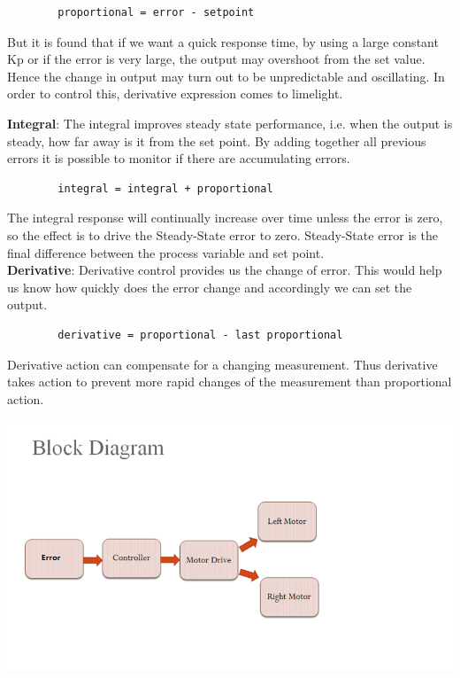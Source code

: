 \documentclass[report]{res}
\begin{document}
\begin{itemize}
		\begin{lstlisting}
		proportional = error - setpoint
		\end{lstlisting}
		
		\qquad But it is found that if we want a quick response time, by using a large constant Kp or if the error is very large, the output may overshoot from the set value. Hence the change in output may turn out to be unpredictable and oscillating. In order to control this, derivative expression comes to limelight.
		
		\textbf{Integral}: The integral improves steady state performance, i.e. when the output is steady, how far away is it from the set point. By adding together all previous errors it is possible to monitor if there are accumulating errors.
		
		\begin{lstlisting}
		integral = integral + proportional
		\end{lstlisting} 
		
		The integral response will continually increase over time unless the error is zero, so the effect is to drive the Steady-State error to zero. Steady-State error is the final difference between the process variable and set point.\\ 
		
		\textbf{Derivative}: Derivative control provides us the change of error. This would help us know how quickly does the error change and accordingly we can set the output.
		
		\begin{lstlisting}
		derivative = proportional - last proportional
		\end{lstlisting}
		
		Derivative action can compensate for a changing measurement. Thus derivative takes action to prevent more rapid changes of the measurement than proportional action.
		\\
		
		\begin{center}
			\includegraphics[scale = 1]{graphics/pid.png}
		\end{center}	
		
	\end{itemize}
	
\end{document}
